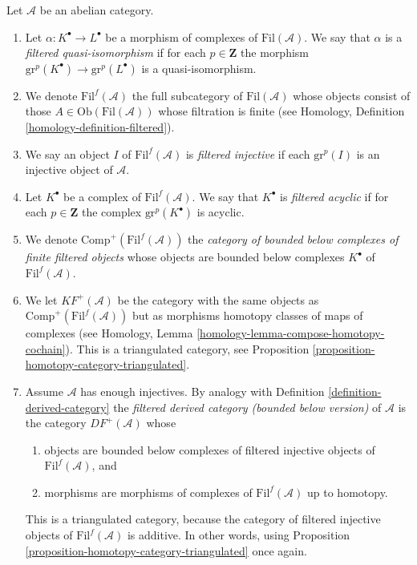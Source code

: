\begin{definition}
\label{definition-filtered-complexes-notation}
Let $\mathcal{A}$ be an abelian category.
\begin{enumerate}
\item Let $\alpha : K^\bullet \to L^\bullet$ be a morphism of
complexes of $\text{Fil}(\mathcal{A})$. We say that
$\alpha$ is a {\it filtered quasi-isomorphism} if
for each $p \in \mathbf{Z}$ the morphism
$\text{gr}^p(K^\bullet) \to \text{gr}^p(L^\bullet)$ is
a quasi-isomorphism.
\item We denote $\text{Fil}^f(\mathcal{A})$ the full subcategory
of $\text{Fil}(\mathcal{A})$ whose objects consist of
those $A \in \text{Ob}(\text{Fil}(\mathcal{A}))$
whose filtration is finite (see
Homology, Definition \ref{homology-definition-filtered}).
\item We say an object $I$ of $\text{Fil}^f(\mathcal{A})$
is {\it filtered injective} if each $\text{gr}^p(I)$ is
an injective object of $\mathcal{A}$.
\item Let $K^\bullet$ be a complex of $\text{Fil}^f(\mathcal{A})$.
We say that $K^\bullet$ is {\it filtered acyclic} if
for each $p \in \mathbf{Z}$ the complex $\text{gr}^p(K^\bullet)$ is
acyclic.
\item We denote $\text{Comp}^{+}(\text{Fil}^f(\mathcal{A}))$ the
{\it category of bounded below complexes of finite filtered objects}
whose objects are bounded below complexes
$K^\bullet$ of $\text{Fil}^f(\mathcal{A})$.
\item We let $KF^{+}(\mathcal{A})$ be the category with the same objects
as $\text{Comp}^{+}(\text{Fil}^f(\mathcal{A}))$
but as morphisms homotopy classes of
maps of complexes (see
Homology, Lemma \ref{homology-lemma-compose-homotopy-cochain}).
This is a triangulated category, see
Proposition \ref{proposition-homotopy-category-triangulated}.
\item Assume $\mathcal{A}$ has enough injectives.
By analogy with Definition \ref{definition-derived-category}
the {\it filtered derived category (bounded below version)} of $\mathcal{A}$
is the category $DF^{+}(\mathcal{A})$ whose
\begin{enumerate}
\item objects are bounded below complexes of filtered injective objects
of $\text{Fil}^f(\mathcal{A})$, and
\item morphisms are morphisms of complexes of $\text{Fil}^f(\mathcal{A})$
up to homotopy.
\end{enumerate}
This is a triangulated category, because the category of filtered
injective objects of $\text{Fil}^f(\mathcal{A})$ is additive.
In other words, using
Proposition \ref{proposition-homotopy-category-triangulated}
once again.
\end{enumerate}
\end{definition}

